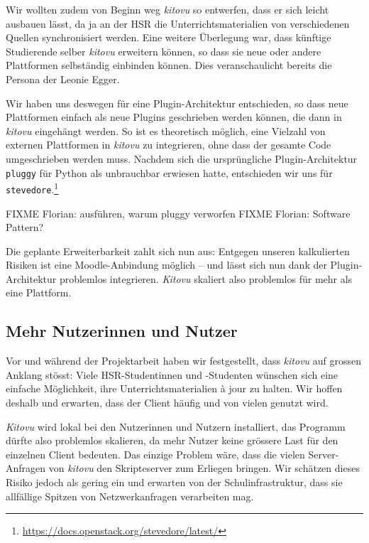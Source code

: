 \documentclass[a4paper]{article}
\begin{document}
Wir wollten zudem von Beginn weg \emph{kitovu} so entwerfen, dass er sich leicht ausbauen lässt, da ja an der HSR die Unterrichtsmaterialien von verschiedenen Quellen synchronisiert werden. Eine weitere Überlegung war, dass künftige Studierende selber \emph{kitovu} erweitern können, so dass sie neue oder andere Plattformen selbständig einbinden können. Dies veranschaulicht bereits die Persona der Leonie Egger. 

Wir haben uns deswegen für eine Plugin-Architektur entschieden, so dass neue Plattformen einfach als neue Plugins geschrieben werden können, die dann in \emph{kitovu} eingehängt werden. So ist es theoretisch möglich, eine Vielzahl von externen Plattformen in \emph{kitovu} zu integrieren, ohne dass der gesamte Code umgeschrieben werden muss. Nachdem sich die ursprüngliche Plugin-Architektur \verb|pluggy| für Python als unbrauchbar erwiesen hatte, entschieden wir uns für \verb|stevedore|.\footnote{\url{https://docs.openstack.org/stevedore/latest/}}

FIXME Florian: ausführen, warum pluggy verworfen
FIXME Florian: Software Pattern?

Die geplante Erweiterbarkeit zahlt sich nun aus: Entgegen unseren kalkulierten Risiken ist eine Moodle-Anbindung möglich -- und lässt sich nun dank der Plugin-Architektur problemlos integrieren. \emph{Kitovu} skaliert also problemlos für mehr als eine Plattform.


\subsection{Mehr Nutzerinnen und Nutzer}

Vor und während der Projektarbeit haben wir festgestellt, dass \emph{kitovu} auf grossen Anklang stösst: Viele HSR-Studentinnen und -Studenten wünschen sich eine einfache Möglichkeit, ihre Unterrichtsmaterialien à jour zu halten. Wir hoffen deshalb und erwarten, dass der Client häufig und von vielen genutzt wird.

\emph{Kitovu} wird lokal bei den Nutzerinnen und Nutzern installiert, das Programm dürfte also problemlos skalieren, da mehr Nutzer keine grössere Last für den einzelnen Client bedeuten. Das einzige Problem wäre, dass die vielen Server-Anfragen von \emph{kitovu} den Skripteserver zum Erliegen bringen. Wir schätzen dieses Risiko jedoch als gering ein und erwarten von der Schulinfrastruktur, dass sie allfällige Spitzen von Netzwerkanfragen verarbeiten mag.
\end{document}
